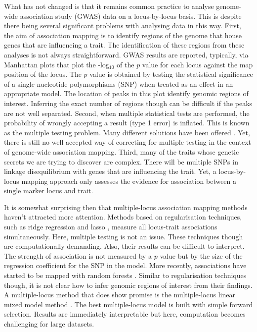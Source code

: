 \documentclass{nature}
\begin{document}
What has not changed is that it remains common practice to analyse genome-wide association study (GWAS) data on a locus-by-locus basis. This is despite there being several significant problems with analysing data in this way. 
First, the aim of association mapping is to identify regions of the genome that house genes that are influencing a trait. 
The identification of these regions from these analyses is not always straightforward. GWAS results are reported, typically, via Manhattan plots 
that plot the -log$_{10}$ of the $p$ value for each locus against the map position of the locus. The $p$ value is obtained by testing the statistical 
significance of a single nucleotide polymorphisms (SNP) when treated as an effect in an appropriate model. 
The location of peaks in this plot identify genomic 
regions of interest. Inferring the exact number of regions though can be difficult if the peaks are not well separated. Second, when multiple statistical tests are performed, the probability of wrongly accepting a result (type 1 error) is inflated. This is known as the multiple testing problem. 
Many different solutions have been offered \cite{storey2003statistical, li2005adjusting, de2005efficiency}. Yet, there is still no well accepted way of correcting for multiple testing in the context of genome-wide association mapping. Third, many of the traits whose genetic secrets we are trying to discover are complex. There will be multiple SNPs in linkage disequilibrium with genes that are influencing the trait. Yet, a locus-by-locus mapping approach only assesses the evidence for association between a single marker locus and trait.

It is somewhat surprising then that multiple-locus association mapping methods haven't attracted more attention. Methods based on 
regularisation techniques, such as ridge regression \cite{shen2013novel}  and lasso \cite{rakitsch2013lasso}, measure all locus-trait associations simultaneously. 
Here, multiple testing is not an issue. These techniques though are computationally demanding. Also, their results can be difficult to interpret. The strength of association is not measured by a $p$ value but by the size of the regression coefficient for the SNP in the model. More recently, associations have started to be mapped with random forests \cite{szymczak2016r2vim}. Similar to regularisation techniques though, it is not clear how to infer genomic regions of interest from their findings. A multiple-locus method that does show promise is the multiple-locus linear mixed model method \cite{segura2012efficient}. The best multiple-locus model is built with simple forward selection. Results are immediately interpretable but here, computation becomes challenging for large datasets. 
\end{document}
